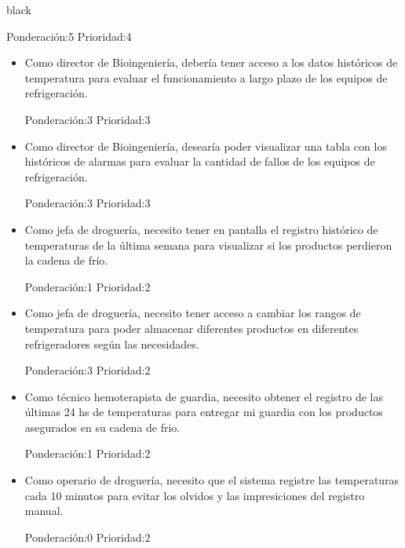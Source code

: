 \documentclass[11pt]{charter}
\begin{document}
\begin{consigna}{black}
\begin{itemize}
Ponderación:5 Prioridad:4
\end{itemize}


\begin{itemize}
\item Como director de Bioingeniería, debería tener acceso a los datos históricos de temperatura para evaluar el funcionamiento a largo plazo de los equipos de refrigeración. 

Ponderación:3 Prioridad:3
\end{itemize}

\begin{itemize}
\item Como director de Bioingeniería, desearía poder visualizar una tabla con los históricos de alarmas para evaluar la cantidad de fallos de los equipos de refrigeración. 

Ponderación:3 Prioridad:3
\end{itemize}


\begin{itemize}
\item Como jefa de droguería, necesito tener en pantalla el registro histórico de temperaturas de la última semana para visualizar si los productos perdieron la cadena de frío. 

Ponderación:1 Prioridad:2
\end{itemize}

\begin{itemize}
\item Como jefa de droguería, necesito tener acceso a cambiar los rangos de temperatura para poder almacenar diferentes productos en diferentes refrigeradores según las necesidades. 

Ponderación:3 Prioridad:2
\end{itemize}

\begin{itemize}
\item Como técnico hemoterapista de guardia, necesito obtener el registro de las últimas 24 hs de temperaturas para entregar mi guardia con los productos asegurados en su cadena de frio. 

Ponderación:1 Prioridad:2
\end{itemize}

\begin{itemize}
\item Como operario de droguería, necesito que el sistema registre las temperaturas cada 10 minutos para evitar los olvidos y las impresiciones del registro manual. 

Ponderación:0 Prioridad:2
\end{itemize}

\end{consigna}
\end{document}

